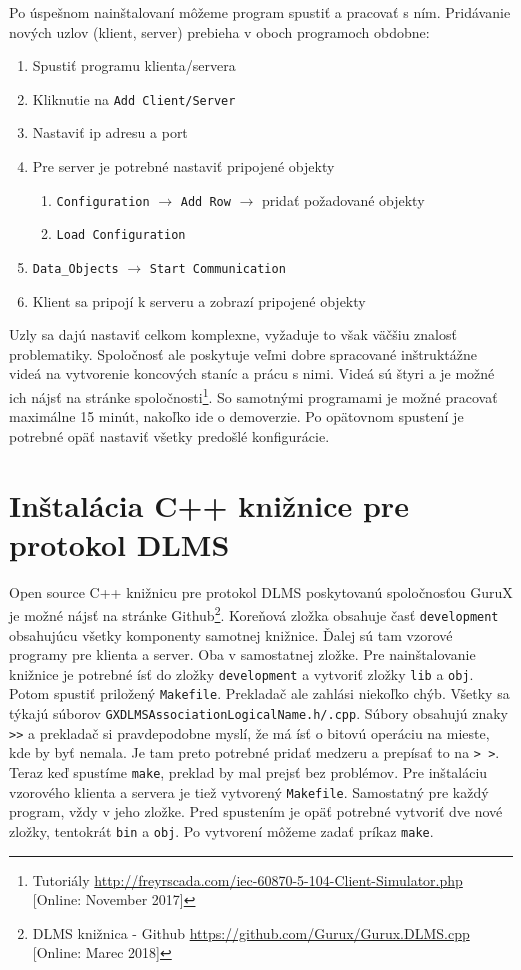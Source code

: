 Po úspešnom nainštalovaní môžeme program spustiť a pracovať s ním. Pridávanie nových uzlov (klient, server) prebieha v oboch programoch obdobne:
\begin{enumerate}
\item Spustiť programu klienta/servera
\item Kliknutie na {\tt Add Client/Server}
\item Nastaviť ip adresu a port
\item Pre server je potrebné nastaviť pripojené objekty
\begin{enumerate}
\item {\tt Configuration} $\rightarrow$ {\tt Add Row} $\rightarrow$ pridať požadované objekty
\item {\tt Load Configuration}
\end{enumerate}
\item {\tt Data\_Objects} $\rightarrow$ {\tt Start Communication}
\item Klient sa pripojí k serveru a zobrazí pripojené objekty
\end{enumerate} \par
Uzly sa dajú nastaviť celkom komplexne, vyžaduje to však väčšiu znalosť problematiky. Spoločnosť ale poskytuje veľmi dobre spracované inštruktážne videá na vytvorenie koncových staníc a prácu s nimi. Videá sú štyri a je možné ich nájsť na stránke spoločnosti\footnote{Tutoriály \url{http://freyrscada.com/iec-60870-5-104-Client-Simulator.php} [Online: November 2017]}. So samotnými programami je možné pracovať maximálne 15 minút, nakoľko ide o demoverzie. Po opätovnom spustení je potrebné opäť nastaviť všetky predošlé konfigurácie.

\chapter{Inštalácia C++ knižnice pre protokol DLMS}
\label{kniznica}
Open source C++ knižnicu pre protokol DLMS poskytovanú spoločnosťou GuruX je možné nájsť na stránke Github\footnote{DLMS knižnica - Github \url{https://github.com/Gurux/Gurux.DLMS.cpp} [Online: Marec 2018]}. Koreňová zložka obsahuje časť {\tt development} obsahujúcu všetky komponenty samotnej knižnice. Ďalej sú tam vzorové programy pre klienta a server. Oba v samostatnej zložke. Pre nainštalovanie knižnice je potrebné ísť do zložky {\tt development} a vytvoriť zložky {\tt lib} a {\tt obj}. Potom spustiť priložený {\tt Makefile}. Prekladač ale zahlási niekoľko chýb. Všetky sa týkajú súborov {\tt GXDLMSAssociationLogicalName.h/.cpp}. Súbory obsahujú znaky {\tt >>} a prekladač si pravdepodobne myslí, že má ísť o bitovú operáciu na mieste, kde by byť nemala. Je tam preto potrebné pridať medzeru a prepísať to na {\tt > >}. Teraz keď spustíme {\tt make}, preklad by mal prejsť bez problémov. Pre inštaláciu vzorového klienta a servera je tiež vytvorený {\tt Makefile}. Samostatný pre každý program, vždy v jeho zložke. Pred spustením je opäť potrebné vytvoriť dve nové zložky, tentokrát {\tt bin} a {\tt obj}. Po vytvorení môžeme zadať príkaz {\tt make}.


